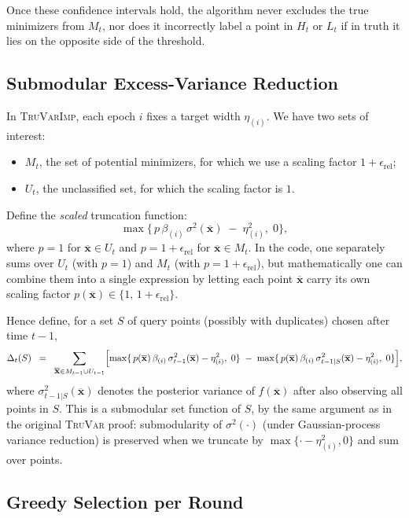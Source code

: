 \documentclass[a4paper,10pt]{article}
\newcommand{\TruVar}{\textsc{TruVar}\xspace}
\newcommand{\TruVarImp}{\textsc{TruVarImp}\xspace}
\newcommand{\xbar}{\mbox{$\overline{\mathbf{x}}$}}
\begin{document}
Once these confidence intervals hold, the algorithm never excludes the true minimizers from $M_t$, nor does it incorrectly label a point in $H_t$ or $L_t$ if in truth it lies on the opposite side of the threshold.

\subsection{Submodular Excess-Variance Reduction}

In \TruVarImp, each epoch $i$ fixes a target width $\eta_{(i)}$.
We have two sets of interest:

\begin{itemize}
    \item $M_t$, the set of potential minimizers, for which we use a scaling factor $1+\epsilon_{\mathrm{rel}}$;
    \item $U_t$, the unclassified set, for which the scaling factor is $1$.
\end{itemize}

Define the \emph{scaled} truncation function:
\[
   \max\{\,p\,\beta_{(i)}\,\sigma^2(\xbar) \;-\; \eta_{(i)}^2,\;0\},
\]
where $p=1$ for $\xbar\in U_t$ and $p=1+\epsilon_{\mathrm{rel}}$ for $\xbar\in M_t$.
In the code, one separately sums over $U_t$ (with $p=1$) and $M_t$ (with $p=1+\epsilon_{\mathrm{rel}}$), but mathematically one can combine them into a single expression by letting each point $\xbar$ carry its own scaling factor $p(\xbar)\in\{1,\,1+\epsilon_{\mathrm{rel}}\}$.

Hence define, for a set $S$ of query points (possibly with duplicates) chosen after time $t-1$,
\[
  \Delta_{t}(S)
  \;\;=\;\;
   \sum_{\xbar\in M_{t-1} \cup U_{t-1}}
   \Bigl[
     \max\{\,p(\xbar)\,\beta_{(i)}\,\sigma_{t-1}^2(\xbar) - \eta_{(i)}^2, \;0\}
     \;-\;
     \max\{\,p(\xbar)\,\beta_{(i)}\,\sigma_{t-1|S}^2(\xbar) - \eta_{(i)}^2, \;0\}
   \Bigr],
\]
where $\sigma_{t-1|S}^2(\xbar)$ denotes the posterior variance of $f(\xbar)$ after also observing all points in $S$.
This is a submodular set function of $S$, by the same argument as in the original \TruVar proof: submodularity of $\sigma^2(\cdot)$ (under Gaussian-process variance reduction) is preserved when we truncate by $\max\{\cdot-\eta_{(i)}^2,0\}$ and sum over points.

\subsection{Greedy Selection per Round}
\end{document}
